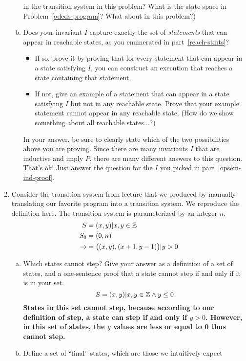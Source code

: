 \documentclass{article}
\begin{document}
\begin{enumerate}[leftmargin=*,itemindent=*,start=1,label={{\bf Problem \arabic*}.},ref=\arabic*]
\begin{enumerate}[(a)]
    in the transition system in this problem? What is the state space in
    Problem~\ref{odeds-program}? What about in this problem?)
  \item Does your invariant $I$ capture exactly the set of \emph{statements} that
    can appear in reachable states, as you enumerated in part~\ref{reach-stmts}?
    \begin{itemize}
    \item If so, prove it by proving that for every statement that can appear in
      a state satisfying $I$, you can construct an execution that reaches a state
      containing that statement.
    \item If not, give an example of a statement that can appear in a state
      satisfying $I$ but not in any reachable state. Prove that your example
      statement cannot appear in any reachable state. (How do we show something
      about all reachable states...?)
    \end{itemize}
    In your answer, be sure to clearly state which of the two possibilities
    above you are proving. Since there are many invariants $I$ that are
    inductive and imply $P$, there are many different answers to this
    question. That's ok! Just answer the question for the $I$ you picked in
    part~\ref{opsem-ind-proof}.
  \end{enumerate}
\clearpage
\item Consider the transition system from lecture that we produced by manually
  translating our favorite program into a transition system. We reproduce the
  definition here. The transition system is parameterized by an integer $n$.
  \begin{align*}
    S &= \set{(x,y) | x,y\in \mathbb{Z}}\\
    S_0 &= \set{(0, n)}\\
    \to &= \Set{\big((x,y),(x+1,y-1)\big) | y > 0}
  \end{align*}
  \begin{enumerate}[(a)]
  \item Which states cannot step? Give your answer as a definition of a set of
    states, and a one-sentence proof that a state cannot step if and only if it
    is in your set.
    $$ S = \set{(x, y) | x, y \in \mathbb{Z} \wedge y \leq 0}$$
    \textbf{States in this set cannot step, because according to our definition of step, a state can step if and only if $y>0$. However, in this set of states, the $y$ values are less or equal to 0 thus cannot step.}
  \item Define a set of ``final'' states, which are those we intuitively expect

\end{enumerate}
\end{enumerate}
\end{document}

